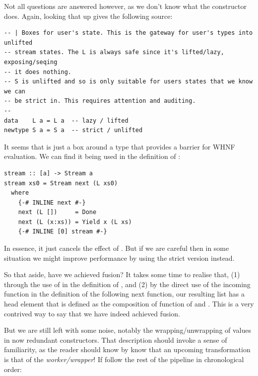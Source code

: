 Not all questions are answered however, as we don't know what the  constructor does. Again, looking that up gives the following source:

\begin{listing}[H]
\begin{verbatim}
-- | Boxes for user's state. This is the gateway for user's types into unlifted
-- stream states. The L is always safe since it's lifted/lazy, exposing/seqing
-- it does nothing.
-- S is unlifted and so is only suitable for users states that we know we can
-- be strict in. This requires attention and auditing. 
--
data    L a = L a  -- lazy / lifted
newtype S a = S a  -- strict / unlifted
\end{verbatim}
\end{listing}

It seems that  is just a box around a type that provides a barrier for WHNF evaluation. We can find it being used in the
definition of :

\begin{listing}[H]
\begin{verbatim}
stream :: [a] -> Stream a
stream xs0 = Stream next (L xs0)
  where
    {-# INLINE next #-}
    next (L [])     = Done
    next (L (x:xs)) = Yield x (L xs)
    {-# INLINE [0] stream #-}
\end{verbatim}
\end{listing}

In essence, it just cancels the effect of . But if we are careful then in some situation we might improve performance by using the
strict version  instead. 

So that aside, have we achieved fusion? It takes some time to realise that, (1) through the use of  in the definition of , and (2)
by the direct use of the incoming  function in the definition of the following next function, our resulting list has a head element that is defined
as the composition of  function of  and . This is a very contrived way to say that we have indeed achieved fusion.

But we are still left with some noise, notably the wrapping/unwrapping of values in now redundant  constructors. That description should invoke
a sense of familiarity, as the reader should know by know that an upcoming transformation is that of the \textit{worker/wrapper}!
If follow the rest of the pipeline in chronological order:

